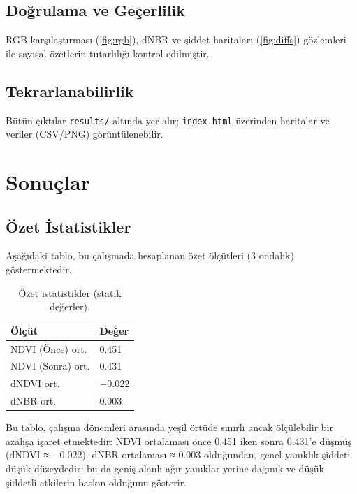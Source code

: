 \documentclass[11pt,a4paper]{article}
\begin{document}
\subsection{Doğrulama ve Geçerlilik}
RGB karşılaştırması (\autoref{fig:rgb}), dNBR ve şiddet haritaları (\autoref{fig:diffs}) gözlemleri ile sayısal özetlerin tutarlılığı kontrol edilmiştir. 

\subsection{Tekrarlanabilirlik}
Bütün çıktılar \texttt{results/} altında yer alır; \texttt{index.html} üzerinden haritalar ve veriler (CSV/PNG) görüntülenebilir.
\section{Sonuçlar}
\subsection{Özet İstatistikler}
Aşağıdaki tablo, bu çalışmada hesaplanan özet ölçütleri (3 ondalık) göstermektedir.
\begin{table}[H]
  \centering
  \begin{tabular}{@{}ll@{}}
  \toprule
  Ölçüt & Değer \\
  \midrule
  NDVI (Önce) ort. & \num{0.451} \\
  NDVI (Sonra) ort. & \num{0.431} \\
  dNDVI ort. & \num{-0.022} \\
  dNBR ort. & \num{0.003} \\
  \bottomrule
  \end{tabular}
  \caption{Özet istatistikler (statik değerler).}
\end{table}

\noindent Bu tablo, çalışma dönemleri arasında yeşil örtüde sınırlı ancak ölçülebilir bir azalışa işaret etmektedir: NDVI ortalaması önce 0.451 iken sonra 0.431’e düşmüş (dNDVI ≈ −0.022). dNBR ortalaması ≈ 0.003 olduğundan, genel yanıklık şiddeti düşük düzeydedir; bu da geniş alanlı ağır yanıklar yerine dağınık ve düşük şiddetli etkilerin baskın olduğunu gösterir.
\end{document}

